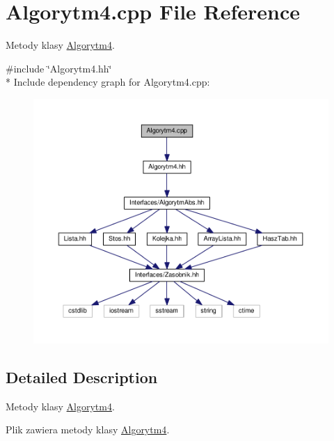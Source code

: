 \hypertarget{a00024}{}\section{Algorytm4.\+cpp File Reference}
\label{a00024}


Metody klasy \hyperlink{a00005}{Algorytm4}.  


{\ttfamily \#include \char`\"{}Algorytm4.\+hh\char`\"{}}\\*
Include dependency graph for Algorytm4.\+cpp\+:
\nopagebreak
\begin{figure}[H]
\begin{center}
\leavevmode
\includegraphics[width=350pt]{a00062}
\end{center}
\end{figure}


\subsection{Detailed Description}
Metody klasy \hyperlink{a00005}{Algorytm4}. 

Plik zawiera metody klasy \hyperlink{a00005}{Algorytm4}. 